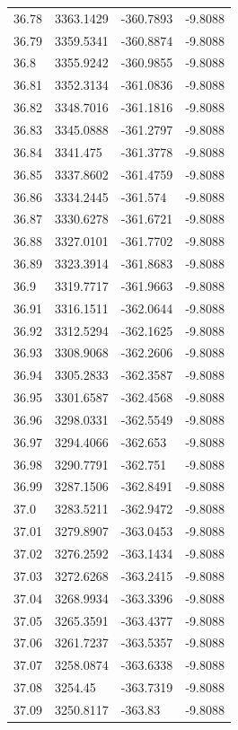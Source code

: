 \begin{table}[H]
\begin{tabular}{llll}
36.78 & 3363.1429 & -360.7893 & -9.8088 \\
36.79 & 3359.5341 & -360.8874 & -9.8088 \\
36.8 & 3355.9242 & -360.9855 & -9.8088 \\
36.81 & 3352.3134 & -361.0836 & -9.8088 \\
36.82 & 3348.7016 & -361.1816 & -9.8088 \\
36.83 & 3345.0888 & -361.2797 & -9.8088 \\
36.84 & 3341.475 & -361.3778 & -9.8088 \\
36.85 & 3337.8602 & -361.4759 & -9.8088 \\
36.86 & 3334.2445 & -361.574 & -9.8088 \\
36.87 & 3330.6278 & -361.6721 & -9.8088 \\
36.88 & 3327.0101 & -361.7702 & -9.8088 \\
36.89 & 3323.3914 & -361.8683 & -9.8088 \\
36.9 & 3319.7717 & -361.9663 & -9.8088 \\
36.91 & 3316.1511 & -362.0644 & -9.8088 \\
36.92 & 3312.5294 & -362.1625 & -9.8088 \\
36.93 & 3308.9068 & -362.2606 & -9.8088 \\
36.94 & 3305.2833 & -362.3587 & -9.8088 \\
36.95 & 3301.6587 & -362.4568 & -9.8088 \\
36.96 & 3298.0331 & -362.5549 & -9.8088 \\
36.97 & 3294.4066 & -362.653 & -9.8088 \\
36.98 & 3290.7791 & -362.751 & -9.8088 \\
36.99 & 3287.1506 & -362.8491 & -9.8088 \\
37.0 & 3283.5211 & -362.9472 & -9.8088 \\
37.01 & 3279.8907 & -363.0453 & -9.8088 \\
37.02 & 3276.2592 & -363.1434 & -9.8088 \\
37.03 & 3272.6268 & -363.2415 & -9.8088 \\
37.04 & 3268.9934 & -363.3396 & -9.8088 \\
37.05 & 3265.3591 & -363.4377 & -9.8088 \\
37.06 & 3261.7237 & -363.5357 & -9.8088 \\
37.07 & 3258.0874 & -363.6338 & -9.8088 \\
37.08 & 3254.45 & -363.7319 & -9.8088 \\
37.09 & 3250.8117 & -363.83 & -9.8088 \\

\end{tabular}
\end{table}
